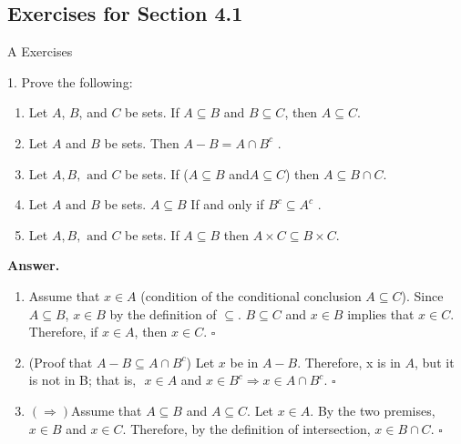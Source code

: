 \documentclass[10pt,]{book}
\theoremstyle{plain}
\theoremstyle{definition}
\theoremstyle{definition}
\theoremstyle{definition}
\begin{document}
\subsection[Exercises for Section 4.1]{Exercises for Section 4.1}\label{exercises-1}
\hypertarget{exercisegroup-1}{}\typeout{************************************************}
\typeout{************************************************}
A Exercises%
\begin{exercisegroup}
\item[1.]\hypertarget{exercise-4-1-1}{} Prove the following:%
\par
\leavevmode%
\begin{enumerate}[label=\alph*]
\item\hypertarget{li-5}{}Let \(A\), \(B\), and \(C\) be sets. If \(A\subseteq B\) and \(B\subseteq C\), then \(A\subseteq C\).%
\item\hypertarget{li-6}{}Let \(A\) and \(B\) be sets. Then \(A - B= A\cap B^c\) .%
\item\hypertarget{li-7}{}Let \(A,B, \textrm{ and } C\) be sets. If (\(A\subseteq B\) and\(A\subseteq C\)) then \(A\subseteq B\cap C\).%
\item\hypertarget{li-8}{}Let \(A \textrm{ and } B\) be sets. \(A\subseteq B\) If and only if \(B^c\subseteq A^c\) .%
\item\hypertarget{li-9}{}Let \(A,B, \textrm{ and } C\) be sets. If \(A\subseteq B\) then \(A\times C \subseteq B\times C\).%
\end{enumerate}
%
\par\smallskip
\par\smallskip
\noindent\textbf{Answer.}\hypertarget{answer-1}{}\quad
\leavevmode%
\begin{enumerate}[label=\alph*]
\item\hypertarget{li-10}{} Assume that \(x\in A\) (condition of the conditional conclusion \(A \subseteq  C\)). Since \(A \subseteq  B\), \(x\in B\) by the definition of \(\subseteq\). \(B\subseteq C\) and \(x\in B\) implies that \(x\in C\). Therefore, if \(x\in A\), then \(x\in C\). \(\square\) %
\item\hypertarget{li-11}{} (Proof that \(A -B \subseteq A\cap B^c\)) Let \(x\) be in \(A - B\). Therefore, x is in \(A\), but it is not in B; that is,\(\text{  }x \in  A\) and      \(x \in  B^c \Rightarrow x\in A\cap B^c\). \(\square\)%
\item\hypertarget{li-12}{}\((\Rightarrow )\)Assume that \(A \subseteq  B\) and \(A \subseteq  C\). Let \(x\in A\). By the two premises,\(x\in B\) and \(x\in C\). Therefore, by the      definition of intersection, \(x\in B\cap C\). \(\square\)%

\end{enumerate}
\end{exercisegroup}
\end{document}
